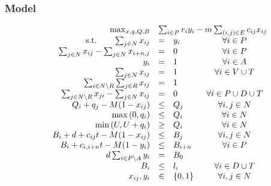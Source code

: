 \subsubsection*{Model}
\begin{equation}
\begin{array}{rrclcl}
& \max_{x, y, Q, B} & \multicolumn{3}{l}{ \sum_{i \in P} r_i y_i - m \sum_{(i,j) \in E} c_{ij} x_{ij}  } \\  
& \textrm{s.t.} \qquad  \sum_{j \in N} x_{ij}   &=& y_i & \forall i \in P \\   %
& \sum_{j \in N} x_{ij} - \sum_{j \in N} x_{i+n,j}  & = & 0 & \forall i \in P  \\     %
& y_i & =& 1 & \forall i \in A \\  %
& \sum_{j \in N} x_{ij}   &=& 1 & \forall i \in V \cup T \\  %
& \sum_{i \in N \setminus R } \sum_{j \in R }  x_{ij}   &=& 1  &\\     %
& \sum_{j \in N \setminus R } x_{ji} - \sum_{j \in N} x_{ij}  & = & 0 & \forall i \in P \cup D \cup T  \\     %
& Q_i + q_j - M (1-x_{ij} ) &\leq& Q_j & \forall i,j \in N \\  %
& \max{(0, q_i)}    &\leq& Q_i & \forall i \in N \\  %
& \min{(U, U+q_i)}    &\geq& Q_i & \forall i \in N \\  %
& B_i + d + c_{ij} t -  M (1-x_{ij} )  &\leq& B_j   & \forall i,j \in N \\  %
& B_i +  c_{i, i+n} t -  M (1- y_i )  &\leq& B_{i+n}  & \forall i \in P \\ %
&  d \sum_{i \in P \setminus A}  y_i  & = & B_0  \\ %
& B_i  &\leq& l_i  & \forall i \in D \cup T \\ %
& x_{ij}, y_i &\in& \{0, 1\} & \forall i,j \in N  \\ 
\end{array}
\end{equation}
\fi

